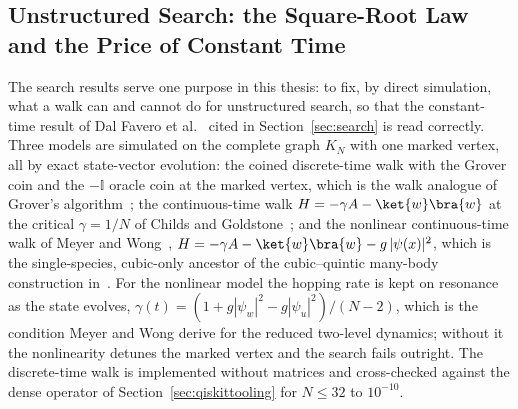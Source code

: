 
\subsection{Unstructured Search: the Square-Root Law and the Price of Constant Time}
\label{sec:res-search}

The search results serve one purpose in this thesis: to fix, by direct
simulation, what a walk can and cannot do for unstructured search, so that
the constant-time result of Dal Favero et al.~\cite{DalFavero_2024} cited in
Section~\ref{sec:search} is read correctly. Three models are simulated on the
complete graph $K_N$ with one marked vertex, all by exact state-vector
evolution: the coined discrete-time walk with the Grover coin and the
$-\mathbb{I}$ oracle coin at the marked vertex, which is the walk analogue of
Grover's algorithm~\cite{Grover_1996, Ambainis_2005}; the continuous-time walk
$H = -\gamma A - \ket{w}\bra{w}$ at the critical $\gamma = 1/N$ of Childs and
Goldstone~\cite{Childs_2004a}; and the nonlinear continuous-time walk of Meyer
and Wong~\cite{Meyer_2013}, $H = -\gamma A - \ket{w}\bra{w} - g\,|\psi(x)|^2$,
which is the single-species, cubic-only ancestor of the cubic--quintic
many-body construction in~\cite{DalFavero_2024}. For the nonlinear model the
hopping rate is kept on resonance as the state evolves, $\gamma(t) = (1 +
g|\psi_w|^2 - g|\psi_u|^2)/(N-2)$, which is the condition Meyer and Wong derive
for the reduced two-level dynamics; without it the nonlinearity detunes the
marked vertex and the search fails outright. The discrete-time walk is
implemented without matrices and cross-checked against the dense operator of
Section~\ref{sec:qiskittooling} for $N \leq 32$ to $10^{-10}$.


